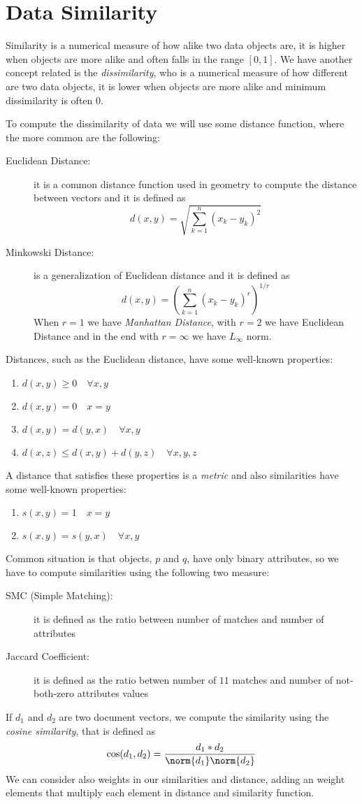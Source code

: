 \chapter{Data Similarity}
Similarity is a numerical measure of how alike two data objects are, it is higher when objects are more alike and often 
falls in the range $[0, 1]$.\newline
We have another concept related is the \emph{dissimilarity}, who is a numerical measure of how different are two data objects, it is lower 
when objects are more alike and minimum dissimilarity is often $0$.

To compute the dissimilarity of data we will use some distance function, where the more common are the following:
\begin{description}
    \item [Euclidean Distance: ] it is a common distance function used in geometry to compute the distance between vectors and it is defined as
                                 \[ d(x, y) = \sqrt{\sum _{k=1}^n (x_k - y_k)^2} \]
    \item [Minkowski Distance: ] is a generalization of Euclidean distance and it is defined as 
    				 \[ d(x, y) = (\sum _{k=1}^n (x_k - y_k)^r)^{1/r} \]
    				 When $r=1$ we have \emph{Manhattan Distance}, with $r=2$ we have Euclidean Distance and in the end with $r=\infty$
				 we have $L_{\infty}$ norm.
\end{description}
Distances, such as the Euclidean distance, have some well-known properties:
\begin{enumerate}
	\item $d(x, y) \geq 0 \quad \forall x, y$
	\item $d(x, y) = 0 \quad x = y$
	\item $d(x, y) = d(y, x) \quad \forall x, y$
	\item $d(x, z) \leq d(x, y) + d(y, z) \quad \forall x, y, z$
\end{enumerate}
A distance that satisfies these properties is a \emph{metric} and also similarities have some well-known properties:
\begin{enumerate}
    \item $s(x, y) = 1 \quad x = y$
    \item $s(x, y) = s(y, x) \quad \forall x, y$
\end{enumerate}
Common situation is that objects, $p$ and $q$, have only binary attributes, so we have to compute similarities using the following two measure:
\begin{description}
    \item [SMC (Simple Matching): ] it is defined as the ratio between number of matches and number of attributes 
    \item [Jaccard Coefficient: ] it is defined as the ratio betwen number of $11$ matches and number of not-both-zero attributes values
\end{description}
If $d_1$ and $d_2$ are two document vectors, we compute the similarity using the \emph{cosine similarity}, that is defined as 
\[ \cos (d_1, d_2) = \frac{d_1 * d_2}{\norm{d_1} \norm{d_2}} \]
We can consider also weights in our similarities and distance, adding an weight elements that multiply each element in distance and similarity function.

